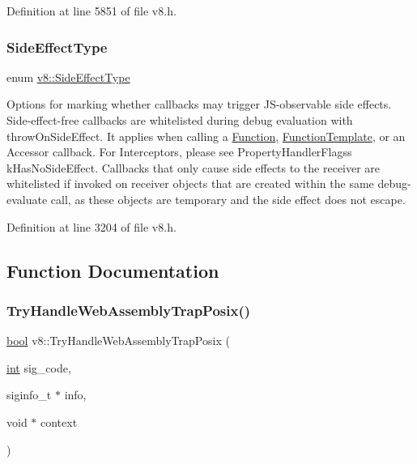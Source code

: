 Definition at line 5851 of file v8.\+h.

\mbox{\label{namespacev8_a29711319c2b9fc7716d65faee2f7b9cb}} 
\subsubsection{\texorpdfstring{Side\+Effect\+Type}{SideEffectType}}
{\footnotesize\ttfamily enum \mbox{\hyperlink{namespacev8_a29711319c2b9fc7716d65faee2f7b9cb}{v8\+::\+Side\+Effect\+Type}}\hspace{0.3cm}{\ttfamily [strong]}}

Options for marking whether callbacks may trigger J\+S-\/observable side effects. Side-\/effect-\/free callbacks are whitelisted during debug evaluation with throw\+On\+Side\+Effect. It applies when calling a \mbox{\hyperlink{classv8_1_1Function}{Function}}, \mbox{\hyperlink{classv8_1_1FunctionTemplate}{Function\+Template}}, or an Accessor callback. For Interceptors, please see Property\+Handler\+Flags\textquotesingle{}s k\+Has\+No\+Side\+Effect. Callbacks that only cause side effects to the receiver are whitelisted if invoked on receiver objects that are created within the same debug-\/evaluate call, as these objects are temporary and the side effect does not escape. 

Definition at line 3204 of file v8.\+h.



\subsection{Function Documentation}
\mbox{\label{namespacev8_a801e3a2af23e3fdef8b4a728bccbcccf}} 
\subsubsection{\texorpdfstring{Try\+Handle\+Web\+Assembly\+Trap\+Posix()}{TryHandleWebAssemblyTrapPosix()}}
{\footnotesize\ttfamily \mbox{\hyperlink{classbool}{bool}} v8\+::\+Try\+Handle\+Web\+Assembly\+Trap\+Posix (\begin{DoxyParamCaption}\item[{\mbox{\hyperlink{classint}{int}}}]{sig\+\_\+code,  }\item[{siginfo\+\_\+t $\ast$}]{info,  }\item[{void $\ast$}]{context }\end{DoxyParamCaption})}

